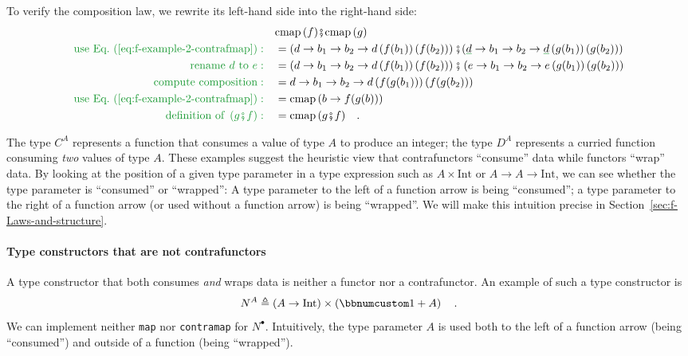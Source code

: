 To verify the composition law, we rewrite its left-hand side into
the right-hand side:
\begin{align*}
 & \text{cmap}\,(f)\bef\text{cmap}\,(g)\\
{\color{greenunder}\text{use Eq.~(\ref{eq:f-example-2-contrafmap})}:}\quad & =\left(d\rightarrow b_{1}\rightarrow b_{2}\rightarrow d\left(f(b_{1})\right)\left(f(b_{2})\right)\right)\bef(\gunderline d\rightarrow b_{1}\rightarrow b_{2}\rightarrow\gunderline d\left(g(b_{1})\right)\left(g(b_{2})\right))\\
{\color{greenunder}\text{rename }d\text{ to }e:}\quad & =\left(d\rightarrow b_{1}\rightarrow b_{2}\rightarrow d\left(f(b_{1})\right)\left(f(b_{2})\right)\right)\bef\left(e\rightarrow b_{1}\rightarrow b_{2}\rightarrow e\left(g(b_{1})\right)\left(g(b_{2})\right)\right)\\
{\color{greenunder}\text{compute composition}:}\quad & =d\rightarrow b_{1}\rightarrow b_{2}\rightarrow d\left(f(g(b_{1}))\right)\left(f(g(b_{2}))\right)\\
{\color{greenunder}\text{use Eq.~(\ref{eq:f-example-2-contrafmap})}:}\quad & =\text{cmap}\,(b\rightarrow f(g(b)))\\
{\color{greenunder}\text{definition of }\left(g\bef f\right):}\quad & =\text{cmap}\,(g\bef f)\quad.
\end{align*}

The type $C^{A}$ represents a function that consumes a value of type
$A$ to produce an integer; the type $D^{A}$ represents a curried
function consuming \emph{two} values of type $A$. These examples
suggest the heuristic view that contrafunctors \textsf{``}consume\textsf{''} data
while functors \textsf{``}wrap\textsf{''} data. By looking at the position of a given
type parameter in a type expression such as $A\times\text{Int}$ or
$A\rightarrow A\rightarrow\text{Int}$, we can see whether the type
parameter is \textsf{``}consumed\textsf{''} or \textsf{``}wrapped\textsf{''}: A type parameter to
the left of a function arrow is being \textsf{``}consumed\textsf{''}; a type parameter
to the right of a function arrow (or used without a function arrow)
is being \textsf{``}wrapped\textsf{''}. We will make this intuition precise in Section~\ref{sec:f-Laws-and-structure}.

\paragraph{Type constructors that are not contrafunctors }

A type constructor that both consumes \emph{and} wraps data is neither
a functor nor a contrafunctor. An example of such a type constructor
is
\[
N^{A}\triangleq\left(A\rightarrow\text{Int}\right)\times\left(\bbnum 1+A\right)\quad.
\]
We can implement neither \lstinline!map! nor \lstinline!contramap!
for $N^{\bullet}$. Intuitively, the type parameter $A$ is used both
to the left of a function arrow (being \textsf{``}consumed\textsf{''}) and outside
of a function (being \textsf{``}wrapped\textsf{''}).

